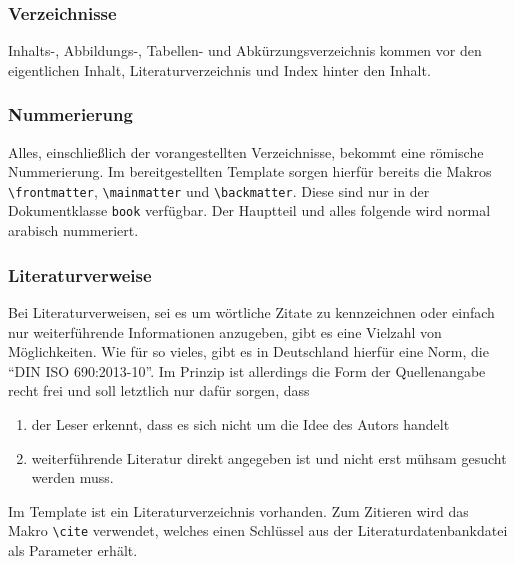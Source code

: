 \documentclass[a4paper, 11pt]{article}
\begin{document}
\subsubsection{Verzeichnisse}

Inhalts-, Abbildungs-, Tabellen- und Abkürzungsverzeichnis kommen vor den eigentlichen Inhalt, Literaturverzeichnis und Index hinter den Inhalt.

\subsubsection{Nummerierung}

Alles, einschließlich der vorangestellten Verzeichnisse, bekommt eine römische Nummerierung. Im bereitgestellten Template sorgen hierfür bereits die Makros \texttt{\textbackslash frontmatter}, \texttt{\textbackslash mainmatter} und \texttt{\textbackslash backmatter}. Diese sind nur in der Dokumentklasse \texttt{book} verfügbar. Der Hauptteil und alles folgende wird normal arabisch nummeriert.

\subsubsection{Literaturverweise}

Bei Literaturverweisen, sei es um wörtliche Zitate zu kennzeichnen oder einfach nur weiterführende Informationen anzugeben, gibt es eine Vielzahl von Möglichkeiten. Wie für so vieles, gibt es in Deutschland hierfür eine Norm, die \enquote{DIN ISO 690:2013-10}. Im Prinzip ist allerdings die Form der Quellenangabe recht frei und soll letztlich nur dafür sorgen, dass
\begin{enumerate}
    \item der Leser erkennt, dass es sich nicht um die Idee des Autors handelt
    \item weiterführende Literatur direkt angegeben ist und nicht erst mühsam gesucht werden muss.
\end{enumerate}

Im Template ist ein Literaturverzeichnis vorhanden. Zum Zitieren wird das Makro \texttt{\textbackslash cite} verwendet, welches einen Schlüssel aus der Literaturdatenbankdatei als Parameter erhält.
\end{document}
